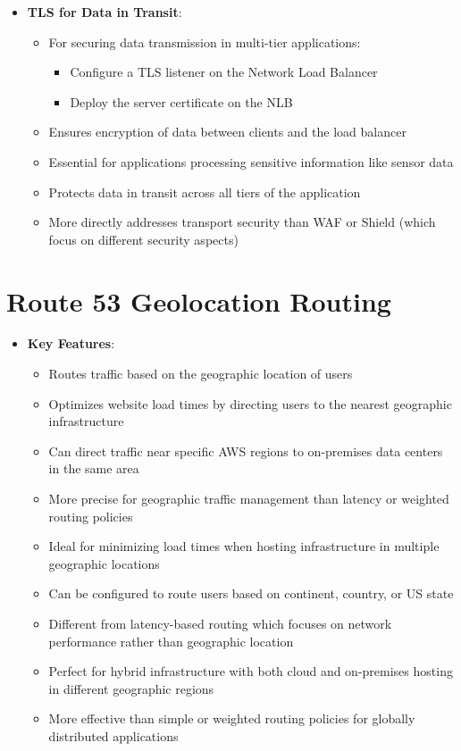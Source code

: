 \documentclass[11pt,a4paper]{report}
\begin{document}
\begin{itemize}
  \item \textbf{TLS for Data in Transit}:
\begin{itemize}
  \item For securing data transmission in multi-tier applications:
\begin{itemize}
  \item Configure a TLS listener on the Network Load Balancer
  \item Deploy the server certificate on the NLB
\end{itemize}
  \item Ensures encryption of data between clients and the load balancer
  \item Essential for applications processing sensitive information like sensor data
  \item Protects data in transit across all tiers of the application
  \item More directly addresses transport security than WAF or Shield (which focus on different security aspects)
\end{itemize}
\end{itemize}


\section{Route 53 Geolocation Routing}

\begin{itemize}
  \item \textbf{Key Features}:
\begin{itemize}
  \item Routes traffic based on the geographic location of users
  \item Optimizes website load times by directing users to the nearest geographic infrastructure
  \item Can direct traffic near specific AWS regions to on-premises data centers in the same area
  \item More precise for geographic traffic management than latency or weighted routing policies
  \item Ideal for minimizing load times when hosting infrastructure in multiple geographic locations
  \item Can be configured to route users based on continent, country, or US state
  \item Different from latency-based routing which focuses on network performance rather than geographic location
  \item Perfect for hybrid infrastructure with both cloud and on-premises hosting in different geographic regions
  \item More effective than simple or weighted routing policies for globally distributed applications
\end{itemize}
\end{itemize}
\end{document}

